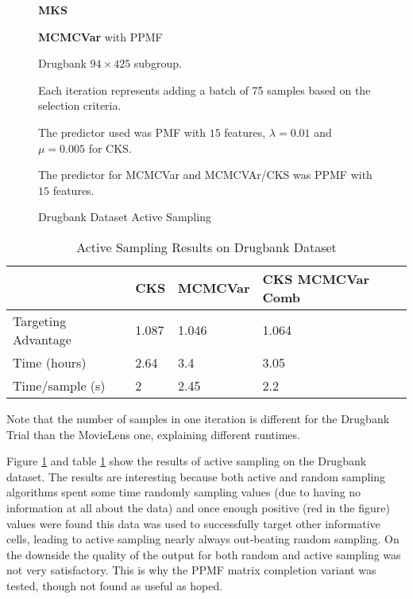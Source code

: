 \begin{figure}[!htbp]
  \begin{center}
    \resizebox{\textwidth}{!}{}
  	\textbf{MKS}
  \end{center}
  
  \begin{center}
    \resizebox{\textwidth}{!}{}
    \textbf{MCMCVar} with PPMF \cite{shan2010generalized}
  \end{center}
  Drugbank $94 \times 425$ subgroup.
  
   Each iteration represents adding a batch of 75 samples based on the selection criteria.
  
  The predictor used was PMF with $15$ features, $\lambda = 0.01$ and $\mu = 0.005$ for CKS.
  
   The predictor for MCMCVar and MCMCVAr/CKS was PPMF with $15$ features.
      
    \caption{Drugbank Dataset Active Sampling}
    \label{fig:drugbank}
\end{figure}

\begin{table}[H]
  \begin{center}
\begin{tabular}{l|l|l|l|}
&	\textbf{CKS}	& \textbf{MCMCVar} & \textbf{CKS MCMCVar Comb} \\ \hline
Targeting Advantage	& 1.087 &	1.046 &	1.064 \\ \hline
Time (hours) &	2.64 &	3.4	& 3.05 \\ \hline
Time/sample (s)	& 2	& 2.45 &	2.2 \\ \hline
\end{tabular}
\end{center}
Note that the number of samples in one iteration is different for the Drugbank Trial than the MovieLens one, explaining different runtimes.
\caption{Active Sampling Results on Drugbank Dataset}
\label{table:drugbank_res}
\end{table}

Figure \ref{fig:drugbank} and table \ref{table:drugbank_res} show the results of active sampling on the Drugbank dataset. The results are interesting because both active and random sampling algorithms spent some time randomly sampling values (due to having no information at all about the data) and once enough positive (red in the figure) values were found this data was used to successfully target other informative cells, leading to active sampling nearly always out-beating random sampling. On the downside the quality of the output for both random and active sampling was not very satisfactory. This is why the PPMF matrix completion variant was tested, though not found as useful as hoped.

